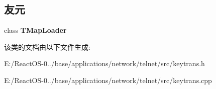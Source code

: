 \subsection*{友元}
\begin{DoxyCompactItemize}
\item 
\mbox{\label{class_key_translator_a32dfef7039d6f37bd1ed46745aa5d218}} 
class {\bfseries T\+Map\+Loader}
\end{DoxyCompactItemize}


该类的文档由以下文件生成\+:\begin{DoxyCompactItemize}
\item 
E\+:/\+React\+O\+S-\/0../base/applications/network/telnet/src/keytrans.\+h\item 
E\+:/\+React\+O\+S-\/0../base/applications/network/telnet/src/keytrans.\+cpp\end{DoxyCompactItemize}
